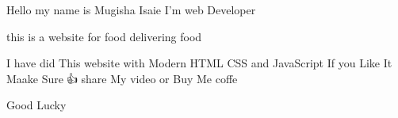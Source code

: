 Hello
my name is Mugisha Isaie I'm web Developer

this is a website for food delivering food


I have did This website with Modern HTML CSS and JavaScript If you Like It
Maake Sure🙌👍
share My video or Buy Me coffe 

Good Lucky